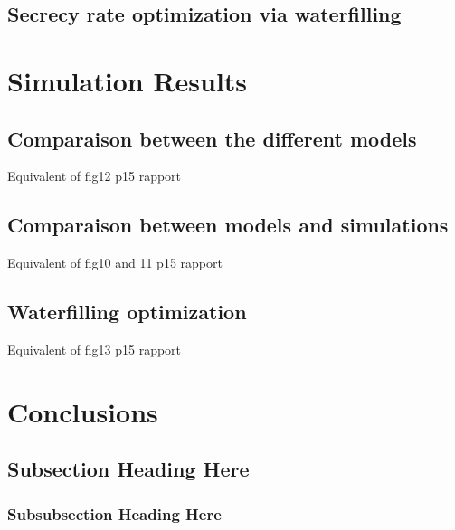\documentclass[journal,comsoc]{IEEEtran}
\let\MYoriglatexcaption\caption
\renewcommand{\caption}[2][\relax]{\MYoriglatexcaption[#2]{#2}}
\begin{document}
\subsection{Secrecy rate optimization via waterfilling}




\section{Simulation Results}

\subsection{Comparaison between the different models}
{\color{red} Equivalent of fig12 p15 rapport}

\subsection{Comparaison between models and simulations}
{\color{red} Equivalent of fig10 and 11 p15 rapport}

\subsection{Waterfilling optimization}
{\color{red} Equivalent of fig13 p15 rapport}

\section{Conclusions}


\subsection{Subsection Heading Here}
\lipsum[1]

\subsubsection{Subsubsection Heading Here}

\lipsum[1]






\end{document}
